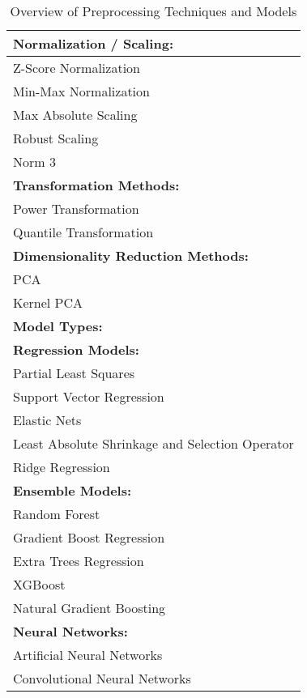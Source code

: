 \begin{table}[ht]
\centering
\begin{tabularx}{\columnwidth}{>{\raggedright\arraybackslash}X}
\toprule
\textbf{Normalization / Scaling:} \\
\midrule
Z-Score Normalization \\
Min-Max Normalization \\
Max Absolute Scaling \\
Robust Scaling \\
Norm 3 \\
\midrule
\textbf{Transformation Methods:} \\
\midrule
Power Transformation \\
Quantile Transformation \\
\midrule
\textbf{Dimensionality Reduction Methods:} \\
\midrule
PCA \\
Kernel PCA \\
\midrule
\textbf{Model Types:} \\
\midrule
\textbf{Regression Models:} \\
\quad Partial Least Squares \\
\quad Support Vector Regression \\
\quad Elastic Nets \\
\quad Least Absolute Shrinkage and Selection Operator \\
\quad Ridge Regression \\
\textbf{Ensemble Models:} \\
\quad Random Forest \\
\quad Gradient Boost Regression \\
\quad Extra Trees Regression \\
\quad XGBoost \\
\quad Natural Gradient Boosting \\
\textbf{Neural Networks:} \\
\quad Artificial Neural Networks \\
\quad Convolutional Neural Networks \\\bottomrule
\end{tabularx}
\caption{Overview of Preprocessing Techniques and Models}
\label{tab:preprocessing-models}
\end{table}
